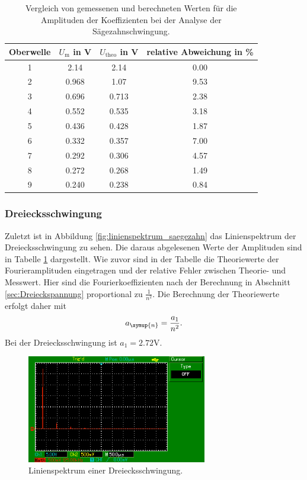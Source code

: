 \begin{table}
  \centering
  \begin{tabular}{c c c c}
    \toprule
    Oberwelle & $U_\text{m}$ in \si{\volt} & $U_\text{theo}$ in \si{\volt} &
    relative Abweichung in \% \\
    \midrule
    1 & 2.14  & 2.14  & 0.00 \\
    2 & 0.968 & 1.07  & 9.53 \\
    3 & 0.696 & 0.713 & 2.38 \\
    4 & 0.552 & 0.535 & 3.18 \\
    5 & 0.436 & 0.428 & 1.87 \\
    6 & 0.332 & 0.357 & 7.00 \\
    7 & 0.292 & 0.306 & 4.57 \\
    8 & 0.272 & 0.268 & 1.49 \\
    9 & 0.240 & 0.238 & 0.84 \\
    \bottomrule
  \end{tabular}
  \caption{Vergleich von gemessenen und berechneten Werten für die Amplituden
    der Koeffizienten bei der Analyse der Sägezahnschwingung.}
  \label{tab:analyse_saegezahn}
\end{table}

\newpage
\subsubsection{Dreiecksschwingung}
Zuletzt ist in Abbildung \ref{fig:linienspektrum_saegezahn} das Linienspektrum der
Dreiecksschwingung zu sehen. Die daraus abgelesenen Werte der Amplituden sind in
Tabelle \ref{tab:analyse_saegezahn} dargestellt. Wie zuvor sind in der Tabelle
die Theoriewerte der Fourieramplituden eingetragen und der relative Fehler
zwischen Theorie- und Messwert.
Hier sind die Fourierkoeffizienten nach der Berechnung in Abschnitt \ref{sec:Dreieckspannung}
proportional zu $\frac{1}{n^2}$. Die Berechnung der Theoriewerte erfolgt daher mit
\begin{equation}
  a_\symup{n} = \frac{a_1}{n^2}.
  \label{eqn:a_n_dreieck}
\end{equation}
Bei der Dreiecksschwingung ist $a_1 = 2.72 \si{\volt}$.

\begin{figure}
  \centering
  \includegraphics[width=0.7\textwidth]{linienspektrum_dreieck.png}
  \caption{Linienspektrum einer Dreiecksschwingung.}
  \label{fig:linienspektrum_dreieck}
\end{figure}

